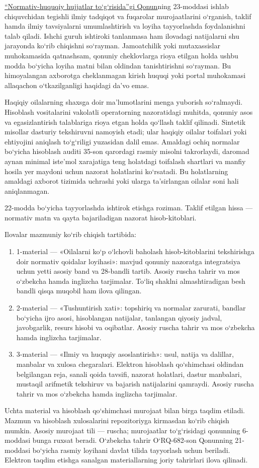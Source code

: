 \documentclass[14pt,a4paper]{extarticle}
\begin{document}
\href{https://lex.uz/docs/-5378966}{“Normativ-huquqiy hujjatlar to‘g‘risida”gi Qonun}ning 23-moddasi ishlab chiquvchidan tegishli ilmiy tadqiqot va fuqarolar murojaatlarini o‘rganish, taklif hamda ilmiy tavsiyalarni umumlashtirish va loyiha tayyorlashda foydalanishni talab qiladi. Ishchi guruh ishtiroki tanlanmasa ham ilovadagi natijalarni shu jarayonda ko‘rib chiqishni so‘rayman. Jamoatchilik yoki mutaxassislar muhokamasida qatnashsam, qonuniy cheklovlarga rioya etilgan holda ushbu modda bo‘yicha loyiha matni bilan oldindan tanishtirishni so‘rayman. Bu himoyalangan axborotga cheklanmagan kirish huquqi yoki portal muhokamasi allaqachon o‘tkazilganligi haqidagi da’vo emas.

Haqiqiy oilalarning shaxsga doir ma’lumotlarini menga yuborish so‘ralmaydi. Hisoblash vositalarini vakolatli operatorning nazoratidagi muhitda, qonuniy asos va egasizlantirish talablariga rioya etgan holda qo‘llash taklif qilinadi. Sintetik misollar dasturiy tekshiruvni namoyish etadi; ular haqiqiy oilalar toifalari yoki ehtiyojini aniqlash to‘g‘riligi yuzasidan dalil emas. Amaldagi ochiq normalar bo‘yicha hisoblash auditi 35-son qarordagi rasmiy misolni takrorlaydi, daromad aynan minimal iste’mol xarajatiga teng holatdagi toifalash shartlari va manfiy hosila yer maydoni uchun nazorat holatlarini ko‘rsatadi. Bu holatlarning amaldagi axborot tizimida uchrashi yoki ularga ta’sirlangan oilalar soni hali aniqlanmagan.

22-modda bo‘yicha tayyorlashda ishtirok etishga roziman. Taklif etilgan hissa — normativ matn va qayta bajariladigan nazorat hisob-kitoblari.

Ilovalar mazmuniy ko‘rib chiqish tartibida:
\begin{enumerate}
\item 1-material — «Oilalarni ko‘p o‘lchovli baholash hisob-kitoblarini tekshirishga doir normativ qoidalar loyihasi»: mavjud qonuniy nazoratga integratsiya uchun yetti asosiy band va 28-bandli tartib. Asosiy ruscha tahrir va mos o‘zbekcha hamda inglizcha tarjimalar. To‘liq shaklni almashtiradigan besh bandli qisqa muqobil ham ilova qilingan.
\item 2-material — «Tushuntirish xati»: topshiriq va normalar zarurati, bandlar bo‘yicha ijro asosi, hisoblangan natijalar, tanlangan qiyosiy jadval, javobgarlik, resurs hisobi va oqibatlar. Asosiy ruscha tahrir va mos o‘zbekcha hamda inglizcha tarjimalar.
\item 3-material — «Ilmiy va huquqiy asoslantirish»: usul, natija va dalillar, manbalar va xulosa chegaralari. Elektron hisoblash qo‘shimchasi oldindan belgilangan reja, sanali qoida tavsifi, nazorat holatlari, dastur manbalari, mustaqil arifmetik tekshiruv va bajarish natijalarini qamraydi. Asosiy ruscha tahrir va mos o‘zbekcha hamda inglizcha tarjimalar.
\end{enumerate}
Uchta material va hisoblash qo‘shimchasi murojaat bilan birga taqdim etiladi. Mazmun va hisoblash xulosalarini repozitoriyga kirmasdan ko‘rib chiqish mumkin. Asosiy murojaat tili — ruscha; murojaatlar to‘g‘risidagi qonunning 6-moddasi bunga ruxsat beradi. O‘zbekcha tahrir O‘RQ-682-son Qonunning 21-moddasi bo‘yicha rasmiy loyihani davlat tilida tayyorlash uchun beriladi. Elektron taqdim etishga sanalgan materiallarning joriy tahrirlari ilova qilinadi.
\end{document}
